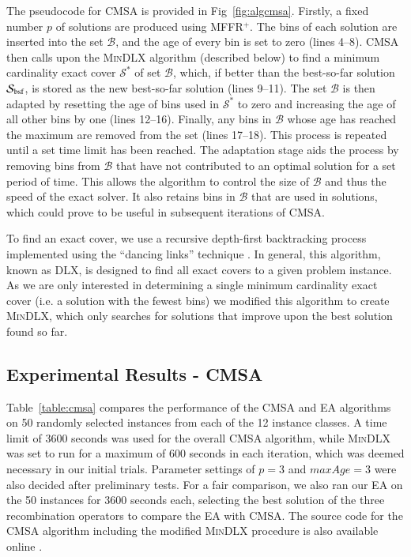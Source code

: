 \documentclass[authoryear]{elsarticle}
\begin{document}
\noindent The pseudocode for CMSA is provided in Fig~\ref{fig:algcmsa}. Firstly, a fixed number $p$ of solutions are produced using MFFR$^+$. The bins of each solution are inserted into the set $\mathcal{B}$, and the age of every bin is set to zero (lines 4--8). CMSA then calls upon the \textsc{MinDLX} algorithm (described below) to find a minimum cardinality exact cover $\mathcal{S}^*$ of set $\mathcal{B}$, which, if better than the best-so-far solution $\mathcal{S}_{\textup{bsf}}$, is stored as the new best-so-far solution (lines 9--11). The set $\mathcal{B}$ is then adapted by resetting the age of bins used in $\mathcal{S}^*$ to zero and increasing the age of all other bins by one (lines 12--16). Finally, any bins in $\mathcal{B}$ whose age has reached the maximum are removed from the set (lines 17--18). This process is repeated until a set time limit has been reached. The adaptation stage aids the process by removing bins from $\mathcal{B}$ that have not contributed to an optimal solution for a set period of time. This allows the algorithm to control the size of $\mathcal{B}$ and thus the speed of the exact solver. It also retains bins in $\mathcal{B}$ that are used in solutions, which could prove to be useful in subsequent iterations of CMSA.

To find an exact cover, we use a recursive depth-first backtracking process implemented using the ``dancing links'' technique \citep{knuth2000}. In general, this algorithm, known as DLX, is designed to find all exact covers to a given problem instance. As we are only interested in determining a single minimum cardinality exact cover (i.e. a solution with the fewest bins) we modified this algorithm to create \textsc{MinDLX}, which only searches for solutions that improve upon the best solution found so far.

\subsection{Experimental Results - CMSA}
\label{sub:expcmsa}
\noindent Table~\ref{table:cmsa} compares the performance of the CMSA and EA algorithms on 50 randomly selected instances from each of the 12 instance classes. A time limit of 3600 seconds was used for the overall CMSA algorithm, while \textsc{MinDLX} was set to run for a maximum of 600 seconds in each iteration, which was deemed necessary in our initial trials. Parameter settings of $p = 3$ and $maxAge = 3$ were also decided after preliminary tests. For a fair comparison, we also ran our EA on the 50 instances for 3600 seconds each, selecting the best solution of the three recombination operators to compare the EA with CMSA. The source code for the CMSA algorithm including the modified \textsc{MinDLX} procedure is also available online \citep{hawa2019cmsa}.
\end{document}
